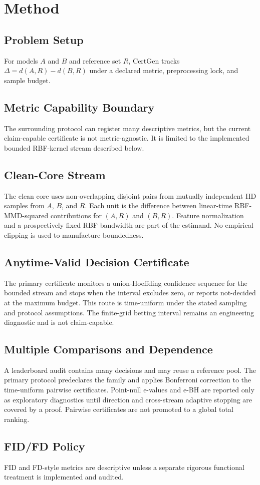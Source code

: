 \section{Method}

\subsection{Problem Setup}
For models $A$ and $B$ and reference set $R$, CertGen tracks $\Delta=d(A,R)-d(B,R)$ under a declared metric, preprocessing lock, and sample budget.

\subsection{Metric Capability Boundary}
The surrounding protocol can register many descriptive metrics, but the current
claim-capable certificate is not metric-agnostic. It is limited to the
implemented bounded RBF-kernel stream described below.

\subsection{Clean-Core Stream}
The clean core uses non-overlapping disjoint pairs from mutually independent IID
samples from $A$, $B$, and $R$. Each unit is the difference between linear-time
RBF-MMD-squared contributions for $(A,R)$ and $(B,R)$. Feature normalization and
a prospectively fixed RBF bandwidth are part of the estimand. No empirical
clipping is used to manufacture boundedness.

\subsection{Anytime-Valid Decision Certificate}
The primary certificate monitors a union-Hoeffding confidence sequence for the
bounded stream and stops when the interval excludes zero, or reports
not-decided at the maximum budget. This route is time-uniform under the stated
sampling and protocol assumptions. The finite-grid betting interval remains an
engineering diagnostic and is not claim-capable.

\subsection{Multiple Comparisons and Dependence}
A leaderboard audit contains many decisions and may reuse a reference pool. The
primary protocol predeclares the family and applies Bonferroni correction to the
time-uniform pairwise certificates. Point-null e-values and e-BH are reported
only as exploratory diagnostics until direction and cross-stream adaptive
stopping are covered by a proof. Pairwise certificates are not promoted to a
global total ranking.

\subsection{FID/FD Policy}
FID and FD-style metrics are descriptive unless a separate rigorous functional treatment is implemented and audited.
